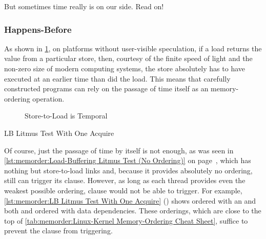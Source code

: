 But sometimes time really is on our side.  Read on!

\subsubsection{Happens-Before}
\label{sec:memorder:Happens-Before}

As shown in
\cref{fig:memorder:Store-to-Load is Temporal},
on platforms without user-visible speculation, if a load returns the value
from a particular store, then, courtesy of the finite speed of light and
the non-zero size of modern computing systems, the store absolutely has
to have executed at an earlier time than did the load.
This means that carefully constructed programs can rely on the
passage of time itself as an memory-ordering operation.

\begin{figure}
\centering
{}
\caption{Store-to-Load is Temporal}
\label{fig:memorder:Store-to-Load is Temporal}
\end{figure}

\begin{listing}

\caption{LB Litmus Test With One Acquire}
\label{lst:memorder:LB Litmus Test With One Acquire}
\end{listing}

Of course, just the passage of time by itself is not enough, as
was seen in
\cref{lst:memorder:Load-Buffering Litmus Test (No Ordering)}
on
page~\pageref{lst:memorder:Load-Buffering Litmus Test (No Ordering)},
which has nothing but store-to-load links and, because it provides
absolutely no ordering, still can trigger its  clause.
However, as long as each thread provides even the weakest possible
ordering,  clause would not be able to trigger.
For example,
\cref{lst:memorder:LB Litmus Test With One Acquire}
()
shows  ordered with an  and
both  and  ordered with data dependencies.
These orderings, which are close to the top of
\cref{tab:memorder:Linux-Kernel Memory-Ordering Cheat Sheet},
suffice to prevent the  clause from triggering.

